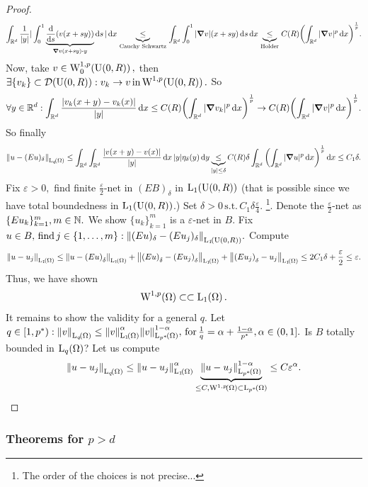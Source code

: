 \documentclass{article}
\begin{document}
\begin{proof}
	\[
		\int_{\R^d}\frac{1}{|y|}|\int_{0}^1 \underbrace{\dv{s} \qty(v(x+sy))}_{\grad v\qty(x+sy) \vdot y}\dd{s}|\dd{x} \underbrace{\leq}_{\, \text{Cauchy Schwartz} \,} \int_{\R^d}\int_{0}^1 |\grad v| (x+sy)\dd{s}\dd{x} \underbrace{\leq}_{\, \text{Holder} \,} C(R)\qty(\int_{\R^d}|\grad v|^p \dd{x})^{\frac{1}{p}}.
	\]
	Now, take $v \in \WkpzeroSet[1][p]{\text{U}(0,R)}, $ then $\exists \{v_k\} \subset \mathcal{D}\qty(\text{U}(0,R)): v_k \to v \, \text{in} \, \WkpSet[1][p]{\text{U}(0,R)}.$ So
	\[
		\forall y \in {\mathbb R}^d: \int_{{\mathbb R}^d}\frac{|v_k(x+y)-v_k(x)|}{|y|}\dd{x}\leq C(R) \qty(\int_{{\mathbb R}^d}|\grad v_k|^p\dd{x})^{\frac{1}{p}} \to C(R)\qty(\int_{{\mathbb R}^d}|\grad v|^p\dd{x})^{\frac{1}{p}}.
	\]
	So finally
	\[
		\norm{u-(Eu)_{\delta}}_{\LpSet[q]{\Omega}} \leq \int_{\R^d}\int_{\R^d}\frac{|v(x+y)-v(x)|}{|y|}\dd{x} |y| \eta_{\delta}(y)\dd{y} \underbrace{\leq}_{|y|\leq \delta} C(R) \delta \int_{\R^d}\qty(\int_{\R^d}|\grad u|^p \dd{x})^{\frac{1}{p}}\dd{x} \leq C_1 \delta.
	\]
	Fix $\varepsilon >0, $ find finite $\frac{\varepsilon}{2}$-net in $(EB)_{\delta}$ in $\LpSet[1]{\text{U}(0,R)}$ (that is possible since we have total boundedness in $\LpSet[1]{\text{U}(0,R)}$.) Set $\delta >0 \, \text{s.t.} \, C_1 \delta \frac{\varepsilon}{4}.$ \footnote{The order of the choices is not precise...}. Denote the $\frac{\varepsilon}{2}$-net as $\{Eu_k\}_{k=1}^{m}, m \in {\mathbb N}.$ We show $\{u_k\}_{k=1}^{m}$ is a $\varepsilon$-net in $B$. Fix $u \in B, \, \text{find} \, j \in \{1,\dots,m\}: \norm{(Eu)_{\delta}-(Eu_j)_{\delta}}_{\LpSet[1]{\text{U}(0,R)}}.$ Compute
	\[
		\norm{u-u_j}_{\LpSet[1]{\Omega}} \leq \norm{u-\qty(Eu)_{\delta}}_{\LpSet[1]{\Omega}} + \norm{\qty(Eu)_{\delta}-\qty(Eu_j)_{\delta}}_{\LpSet[1]{\Omega}}+ \norm{\qty(Eu_j)_{\delta}-u_j}_{\LpSet[1]{\Omega}}\leq 2C_1 \delta + \frac{\varepsilon}{2} \leq \varepsilon.
	\]
	Thus, we have shown
	\[
		\WkpSet[1][p]{\Omega} \subset \subset \LpSet[1]{\Omega}.
	\]
	It remains to show the validity for a general $q$. Let $q \in [1,p^{*}): \norm{v}_{\LpSet[q]{\Omega}} \leq \norm{v}_{\LpSet[1]{\Omega}}^\alpha \norm{v}_{\LpSet[p^{*}]{\Omega}}^{1-\alpha}, \, \text{for} \, \frac{1}{q}=\alpha + \frac{1-\alpha}{p^{*}}, \alpha \in (0,1].$ Is $B$ totally bounded in $\LpSet[q]{\Omega}$? Let us compute
	\[
		\norm{u-u_j}_{\LpSet[q]{\Omega}}\leq \norm{u-u_j}_{\LpSet[1]{\Omega}}^\alpha \underbrace{\norm{u-u_j}_{\LpSet[p^{*}]{\Omega}}^{1-\alpha}}_{\leq C, \WkpSet[1][p]{\Omega}\subset \LpSet[p^{*}]{\Omega}}\leq C \varepsilon^\alpha.
	\]
\end{proof}

\subsubsection{Theorems for $p>d$}
\label{sec:emedding_p_ge_q}
\end{document}
